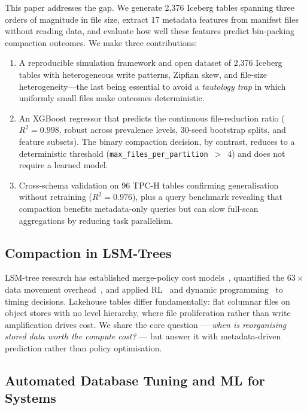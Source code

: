 \documentclass[conference, 10pt]{IEEEtran}
\begin{document}
This paper addresses the gap. We generate 2{,}376 Iceberg tables spanning three
orders of magnitude in file size, extract 17 metadata features from manifest
files without reading data, and evaluate how well these features predict
bin-packing compaction outcomes. We make three contributions:
\begin{enumerate}
\item A reproducible simulation framework and open dataset of 2{,}376 Iceberg
      tables with heterogeneous write patterns, Zipfian skew, and
      file-size heterogeneity---the last being essential to avoid a
      \emph{tautology trap} in which uniformly small files make outcomes
      deterministic.
\item An XGBoost regressor that predicts the continuous file-reduction
      ratio ($R^2 = 0.998$, robust across prevalence levels, 30-seed
      bootstrap splits, and feature subsets). The binary compaction
      decision, by contrast, reduces to a deterministic threshold
      (\texttt{max\_files\_per\_partition}~$>$~4) and does not require
      a learned model.
\item Cross-schema validation on 96 TPC-H tables confirming
      generalisation without retraining ($R^2 = 0.976$), plus a query
      benchmark revealing that compaction benefits metadata-only
      queries but can slow full-scan aggregations by reducing task
      parallelism.
\end{enumerate}

\subsection{Compaction in LSM-Trees}

LSM-tree research has established merge-policy cost
models~\cite{dayan2017monkey, dayan2018dostoevsky}, quantified the
$63\times$ data movement overhead~\cite{sarkar2021compaction}, and
applied RL~\cite{mo2023ruskey} and dynamic
programming~\cite{ecotune2025} to timing decisions.
Lakehouse tables differ fundamentally: flat columnar files on object
stores with no level hierarchy, where file proliferation rather than
write amplification drives cost. We share the core question ---
\emph{when is reorganising stored data worth the compute cost?} ---
but answer it with metadata-driven prediction rather than policy
optimisation.

\subsection{Automated Database Tuning and ML for Systems}
\end{document}
